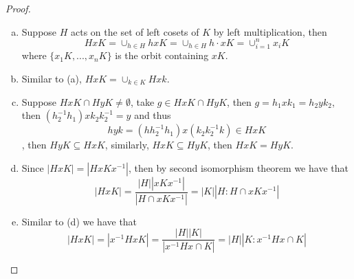 \documentclass{article}
\begin{document}
\begin{proof}
    \begin{enumerate}[(a)]
        \item Suppose $H$ acts on the set of left cosets of $K$ by left multiplication, then 
        \[
            HxK=\cup_{h \in H} hxK=\cup_{h \in H}h \cdot x K=\cup_{i=1}^nx_iK
        \]
        where $\{x_1K, ..., x_nK\}$ is the orbit containing $xK$.
        \item Similar to (a), $HxK=\cup_{k \in K} Hxk$.
        
        \item Suppose $HxK \cap HyK\neq \emptyset $, take $g \in Hx K \cap HyK$, then $g=h_1xk_1 =h_2 y k_2$, then $(h_2^{-1}h_1)x k_2k_2^{-1}=y$ and thus 
        \[
        hyk = (hh_2^{-1}h_1)x (k_2k_2^{-1}k)\in HxK
        \], then $HyK\subseteq HxK$, similarly, $Hx K\subseteq HyK$, then $HxK=HyK$.
        \item Since $|HxK|=|HxKx^{-1}|$, then by second isomorphism theorem we have that 
        \[
        |HxK|=\frac{|H||xKx^{-1}|}{|H \cap xKx^{-1}|}=|K||H:H\cap x Kx^{-1}|
        \]
        \item Similar to (d) we have that 
        \[
        |HxK|=|x^{-1}HxK|=\frac{|H||K|}{|x^{-1}Hx\cap K|}=|H||K:x^{-1}Hx\cap K|
        \]
    \end{enumerate}
\end{proof}
\end{document}
